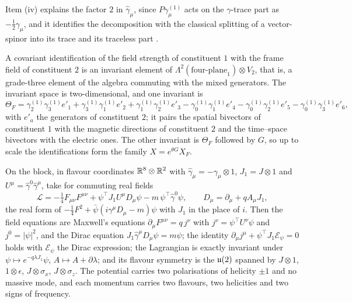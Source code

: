 Item (iv) explains the factor $2$ in $\hat\gamma_\mu$, since $P\gamma^{(1)}_\mu$ acts on the $\gamma$-trace part as $-\tfrac12\gamma_\mu$, and it
identifies the decomposition with the classical splitting of a vector-spinor into its trace and its traceless part
\cite{RaritaSchwinger41}.

A covariant identification of the field strength of constituent $1$ with the frame field of constituent $2$ is an invariant element
of $\Lambda^2(\text{four-plane}_1)\otimes V_2$, that is, a grade-three element of the algebra commuting with the mixed generators. The
invariant space is two-dimensional, and one invariant is
\[
\Theta_F=\gamma^{(1)}_2\gamma^{(1)}_3e'_1+\gamma^{(1)}_3\gamma^{(1)}_1e'_2+\gamma^{(1)}_1\gamma^{(1)}_2e'_3
-\gamma^{(1)}_0\gamma^{(1)}_1e'_4-\gamma^{(1)}_0\gamma^{(1)}_2e'_5-\gamma^{(1)}_0\gamma^{(1)}_3e'_6 ,
\]
with $e'_a$ the generators of constituent $2$; it pairs the spatial bivectors of constituent $1$ with the magnetic directions of
constituent $2$ and the time--space bivectors with the electric ones. The other invariant is $\Theta_F$ followed by $G$, so up to scale
the identifications form the family $X=e^{\theta G}X_F$.

\begin{theorem}
\label{thm:coupled}
On the block, in flavour coordinates $\mathbb{R}^8\otimes\mathbb{R}^2$ with $\hat\gamma_\mu=-\gamma_\mu\otimes1$, $J_1=J\otimes1$ and $U^\mu=\hat\gamma^0\hat\gamma^\mu$, take
for commuting real fields
\begin{equation}
\label{eq:coupledL}
\mathcal L=-\tfrac14F_{\mu\nu}F^{\mu\nu}+\psi^{\!\top}J_1U^\mu D_\mu\psi-m\,\psi^{\!\top}\hat\gamma^0\psi,\qquad D_\mu=\partial_\mu+qA_\mu J_1 ,
\end{equation}
the real form of $-\tfrac14F^2+\bar\psi(i\gamma^\mu D_\mu-m)\psi$ with $J_1$ in the place of $i$. Then the field equations are Maxwell's
equations $\partial_\mu F^{\mu\nu}=q\,j^\nu$ with $j^\nu=\psi^{\!\top}U^\nu\psi$ and $j^0=|\psi|^2$, and the Dirac equation
$J_1\hat\gamma^\mu D_\mu\psi=m\psi$; the identity $\partial_\mu j^\mu+\psi^{\!\top}J_1\mathcal E_\psi=0$ holds with $\mathcal E_\psi$ the Dirac
expression; the Lagrangian is exactly invariant under $\psi\mapsto e^{-q\lambda J_1}\psi$, $A\mapsto A+\partial\lambda$; and its flavour
symmetry is the $\mathfrak{u}(2)$ spanned by $J\otimes1$, $1\otimes\epsilon$, $J\otimes\sigma_x$, $J\otimes\sigma_z$. The potential carries two
polarisations of helicity $\pm1$ and no massive mode, and each momentum carries two flavours, two helicities and two signs of frequency.
\end{theorem}

